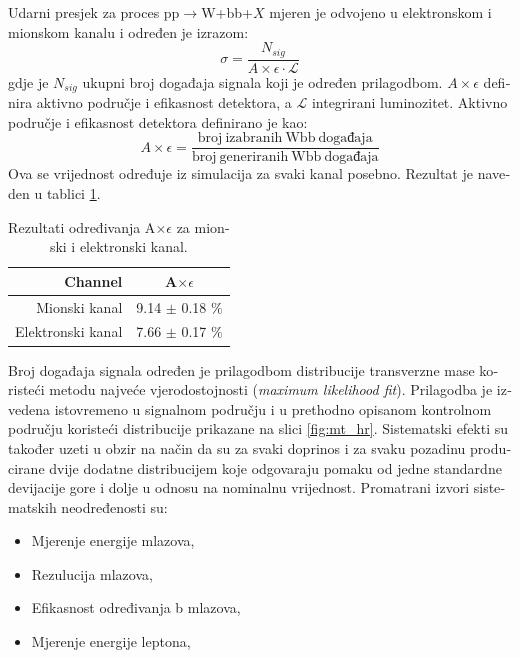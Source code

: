 \begin{otherlanguage}{croatian}
Udarni presjek za proces pp$\rightarrow$W+bb+$X$ mjeren je odvojeno u elektronskom i mionskom kanalu i određen je izrazom:
\begin{equation}
\sigma = \frac{N_{sig}}{A\times \epsilon \cdot \mathcal{L}}
\label{equ:xsec_hr}
\end{equation}
gdje je $N_{sig}$ ukupni broj događaja signala koji je određen prilagodbom. $A\times \epsilon$ definira aktivno područje i efikasnost detektora, a $\mathcal{L}$ integrirani luminozitet. 
Aktivno područje i efikasnost detektora definirano je kao:
\begin{equation}
A\times \epsilon=\frac{\mathrm{broj\ izabranih\ Wbb\ događaja}}{\mathrm{broj\ generiranih\ Wbb\ događaja}}
\end{equation}
Ova se vrijednost određuje iz simulacija za svaki kanal posebno. Rezultat je naveden u tablici \ref{tab:AE_hr}.
\begin{table}[!htb]
\begin{center}
   \begin{tabular} {r c} \hline \hline
        Channel         & A$\times \epsilon$ \\
        \hline
        Mionski kanal         & 9.14 $\pm$ 0.18 $\%$ \\
        Elektronski kanal     & 7.66 $\pm$ 0.17 $\%$ \\
        \hline\hline
   \end{tabular}
\caption{Rezultati određivanja A$\times \epsilon$ za mionski i elektronski kanal.}
\label{tab:AE_hr}
\end{center}
\end{table}
Broj događaja signala određen je prilagodbom distribucije transverzne mase koristeći metodu najveće vjerodostojnosti (\textit{maximum likelihood fit}). Prilagodba je izvedena istovremeno u signalnom području i u prethodno opisanom kontrolnom području koristeći distribucije prikazane na slici \ref{fig:mt_hr}. Sistematski efekti su također uzeti u obzir na način da su za svaki doprinos i za svaku pozadinu producirane dvije dodatne distribucijem koje odgovaraju pomaku od jedne standardne devijacije gore i dolje u odnosu na nominalnu vrijednost. Promatrani izvori sistematskih neodređenosti su:
\begin{itemize}
\item Mjerenje energije mlazova,
\item Rezulucija mlazova,
\item Efikasnost određivanja b mlazova,
\item Mjerenje energije leptona,

\end{itemize}
\end{otherlanguage}
